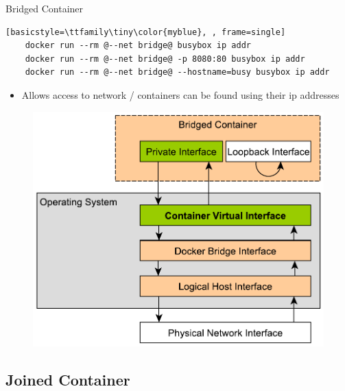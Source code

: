 \begin{frame}[fragile]{Bridged Container}
  \begin{lstlisting}[basicstyle=\ttfamily\tiny\color{myblue}, , frame=single]
    docker run --rm @--net bridge@ busybox ip addr
    docker run --rm @--net bridge@ -p 8080:80 busybox ip addr
    docker run --rm @--net bridge@ --hostname=busy busybox ip addr
  \end{lstlisting}
  \begin{itemize}
    \item Allows access to network / containers can be found using their ip addresses
  \end{itemize}  
  \begin{figure}
    \includegraphics[scale=0.4]{figures/net-bridged-container.pdf}
  \end{figure}
\end{frame}

\subsection{Joined Container}

